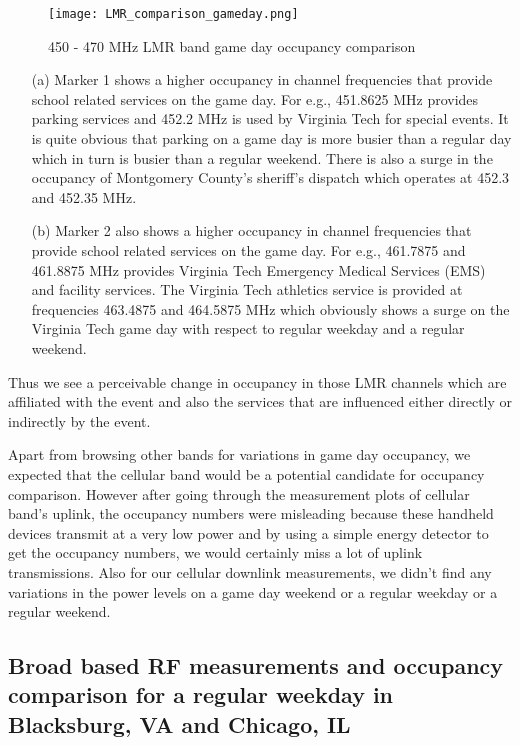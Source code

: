 \documentclass[12pt,sts]{report}
\begin{document}
		\begin{figure}[ht!]
			\centering
				\texttt{[image: LMR\_comparison\_gameday.png]}
			\caption{450 - 470 MHz LMR band game day occupancy comparison}
		\end{figure}
		
		\begin{enumerate}
			\item[(a)] Marker 1 shows a higher occupancy in channel frequencies that provide school related services on the game day. For e.g., 451.8625 MHz provides parking services and 452.2 MHz is used by Virginia Tech for special events. It is quite obvious that parking on a game day is more busier than a regular day which in turn is busier than a regular weekend. There is also a surge in the occupancy of Montgomery County's sheriff's dispatch which operates at 452.3 and 452.35 MHz.
			\item[(b)] Marker 2 also shows a higher occupancy in channel frequencies that provide school related services on the game day. For e.g., 461.7875 and 461.8875 MHz provides Virginia Tech Emergency Medical Services (EMS) and facility services. The Virginia Tech athletics service is provided at frequencies 463.4875 and 464.5875 MHz which obviously shows a surge on the Virginia Tech game day with respect to regular weekday and a regular weekend.
		\end{enumerate}
		
		Thus we see a perceivable change in occupancy in those LMR channels which are affiliated with the event and also the services that are influenced either directly or indirectly by the event.
		
		Apart from browsing other bands for variations in game day occupancy, we expected that the cellular band would be a potential candidate for occupancy comparison. However after going through the measurement plots of cellular band's uplink, the occupancy numbers were misleading because these handheld devices transmit at a very low power and by using a simple energy detector to get the occupancy numbers, we would certainly miss a lot of uplink transmissions. Also for our cellular downlink measurements, we didn't find any variations in the power levels on a game day weekend or a regular weekday or a regular weekend. 
 	
	\subsection{Broad based RF measurements and occupancy comparison for a regular weekday in Blacksburg, VA and Chicago, IL}
	
\end{document}
